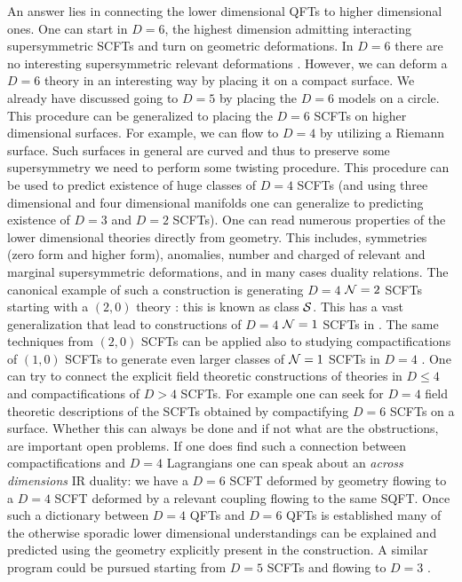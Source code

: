 \documentclass[12pt]{article}
\begin{document}
An answer lies in connecting the lower dimensional QFTs to higher dimensional ones. One can start in $D=6$, the highest dimension admitting interacting supersymmetric SCFTs \cite{Nahm:1977tg} and turn on geometric deformations. In $D=6$ there are no interesting supersymmetric relevant deformations \cite{Cordova:2016xhm}. However, we can deform a $D=6$ theory in an interesting way by placing it on a compact surface. We already have discussed going to $D=5$ by placing the $D=6$ models on a circle. This procedure can be generalized to placing the $D=6$ SCFTs on higher dimensional surfaces. For example, we can flow to $D=4$ by utilizing a Riemann surface. Such surfaces in general are curved and thus to preserve some supersymmetry we need to perform some twisting procedure. This procedure can be used to predict existence of huge classes of $D=4$ SCFTs (and using three dimensional and four dimensional manifolds one can generalize to predicting existence of $D=3$ and $D=2$ SCFTs). One can read numerous properties of the lower dimensional theories directly from geometry. This includes, symmetries (zero form and higher form), anomalies, number and charged of relevant and marginal supersymmetric deformations, and in many cases duality relations. The canonical example of such a construction is generating $D=4$ ${\cal N}=2$ SCFTs starting with a $(2,0)$ theory \cite{Witten:1997sc,Klemm:1996bj,Gaiotto:2009hg,Gaiotto:2009we}: this is known as class ${\cal S}$. This has a vast generalization that lead to constructions of $D=4$ ${\cal N}=1$ SCFTs in \cite{Benini:2009mz,Bah:2011je,Bah:2011vv,Bah:2012dg}.  The same techniques from $(2,0)$ SCFTs can be applied also to studying compactifications of $(1,0)$ SCFTs to generate even larger classes of ${\cal N}=1$ SCFTs in $D=4$ \cite{Gaiotto:2015usa,Pasquetti:2019hxf,Kim:2017toz,Kim:2018bpg,Razamat:2018gro,Kim:2018lfo,Razamat:2020bix,Nazzal:2021tiu,Hwang:2021xyw}.  One can try to connect  the explicit field theoretic constructions of theories in $D\leq 4$ and compactifications of $D>4$ SCFTs. For example one can seek for $D=4$ field theoretic descriptions of the SCFTs obtained by compactifying $D=6$ SCFTs on a surface. Whether this can always be done and if not what are the obstructions, are important open problems. If one does find such a connection between compactifications and $D=4$ Lagrangians one can speak about an {\it across dimensions} IR duality: we have a $D=6$ SCFT deformed by geometry flowing to a $D=4$ SCFT deformed by a relevant coupling flowing to the same SQFT. Once such a dictionary between $D=4$ QFTs and $D=6$ QFTs is established many of the otherwise sporadic lower dimensional understandings can be explained and predicted using the geometry explicitly present in the construction. A similar program could be pursued starting from $D=5$ SCFTs and flowing to $D=3$ \cite{Sacchi:2021afk,Sacchi:2021wvg}.
\end{document}
